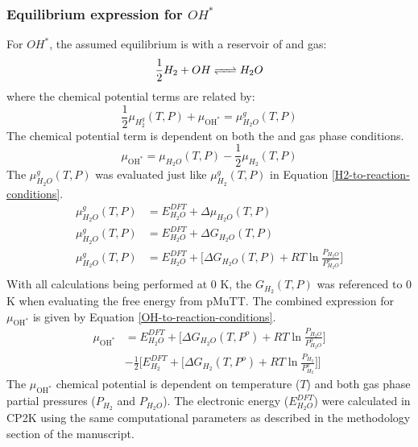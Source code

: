 \documentclass[12pt]{article}
\begin{document}
\subsubsection{Equilibrium expression for $OH^{*}$}
For $OH^{*}$, the assumed equilibrium is with a reservoir of  and  gas:
\begin{equation}
    \frac{1}{2} H_{2} + OH \ce{<=>} H_{2}O
\end{equation}
where the chemical potential terms are related by: 
\begin{equation}
    \frac{1}{2} \mu_{H_{2}^{g}}(T,P) + \mu_{\text{OH}^{*}} = \mu_{H_{2}O}^{g}(T,P) 
\end{equation}
The  chemical potential term is dependent on both the  and  gas phase conditions. 
\begin{equation}
    \mu_{\text{OH}^{*}} = \mu_{H_{2}O}(T,P) - \frac{1}{2} \mu_{H_{2}}(T,P)    
\end{equation}
The $\mu_{H_{2}O}^{g}(T,P)$ was evaluated just like $\mu_{H_{2}}^{g}(T,P)$ in Equation \ref{H2-to-reaction-conditions}. 
\begin{equation}
    \begin{split}
         \mu_{H_{2}O}^{g}(T,P) &= E_{H_{2}O}^{DFT} + \Delta \mu_{H_{2}O}(T,P)  \\
         \mu_{H_{2}O}^{g}(T,P) &= E_{H_{2}O}^{DFT} + \Delta G_{H_{2}O}(T,P) \\ 
         \mu_{H_{2}O}^{g}(T,P) &= E_{H_{2}O}^{DFT} + \Big[ \Delta G_{H_{2}O}(T,P)  + RT \ln{ \frac{P_{H_{2}O}}{P_{H_{2}O}^{o}}} \Big]  \\ 
    \end{split}
    \label{H2O-to-reaction-conditions}
\end{equation}
With all calculations being performed at 0 K, the $G_{H_{2}}(T,P)$ was referenced to 0 K when evaluating the free energy from pMuTT. The combined expression for $\mu_{\text{OH}^{*}}$ is given by Equation \ref{OH-to-reaction-conditions}.
\begin{equation}
    \begin{split}
    \mu_{\text{OH}^{*}} &=  E_{H_{2}O}^{DFT} + \Big[ \Delta G_{H_{2}O}(T,P^{o})  + RT \ln{ \frac{P_{H_{2}O}}{P_{H_{2}O}^{o}}} \Big] \\
    &- \frac{1}{2} \Big[ E_{H_{2}}^{DFT} + \big[ \Delta G_{H_{2}}(T,P^{o})  + RT \ln{ \frac{P_{H_2}}{P_{H_2}^{o}}} \big] \Big] 
    \end{split}
    \label{OH-to-reaction-conditions}
\end{equation} 
The $\mu_{\text{OH}^{*}}$ chemical potential is dependent on temperature ($T$) and both gas phase partial pressures ($P_{H_2}$ and $P_{H_{2}O}$). The electronic energy ($E_{H_{2}O}^{DFT}$) were calculated in CP2K using the same computational parameters as described in the methodology section of the manuscript. \\
\end{document}
